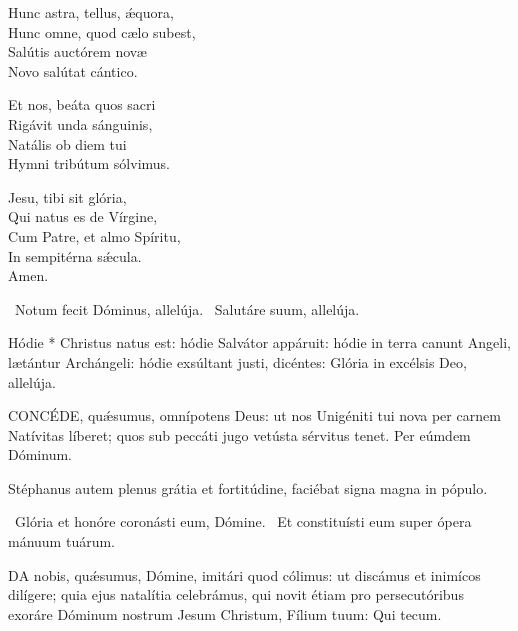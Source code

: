 Hunc astra, tellus, ǽquora,\\
Hunc omne, quod cælo subest,\\
Salútis auctórem novæ\\
Novo salútat cántico.

Et nos, beáta quos sacri\\
Rigávit unda sánguinis,\\
Natális ob diem tui\\
Hymni tribútum sólvimus.

Jesu, tibi sit glória,\\
Qui natus es de Vírgine,\\
Cum Patre, et almo Spíritu,\\
In sempitérna sǽcula.\\
Amen.

\V\ Notum fecit Dóminus, allelúja. \R\ Salutáre suum, allelúja.

 Hódie * Christus natus est: hódie Salvátor appáruit: hódie in terra canunt Angeli, lætántur Archángeli: hódie exsúltant justi, dicéntes: Glória in excélsis Deo, allelúja.


\lettrine[lines=2]{C}{ONCÉDE}, quǽsumus, omnípotens Deus: ut nos Unigéniti tui nova per carnem Natívitas líberet; quos sub peccáti jugo vetústa sérvitus tenet. Per eúmdem Dóminum.



\sectionornament






 Stéphanus autem plenus grátia et fortitúdine, faciébat signa magna in pópulo.

\V\ Glória et honóre coronásti eum, Dómine. \R\ Et constituísti eum super ópera mánuum tuárum.


\lettrine[lines=2]{D}{A} nobis, quǽsumus, Dómine, imitári quod cólimus: ut discámus et inimícos dilígere; quia ejus natalítia celebrámus, qui novit étiam pro persecutóribus exoráre Dóminum nostrum Jesum Christum, Fílium tuum: Qui tecum.

